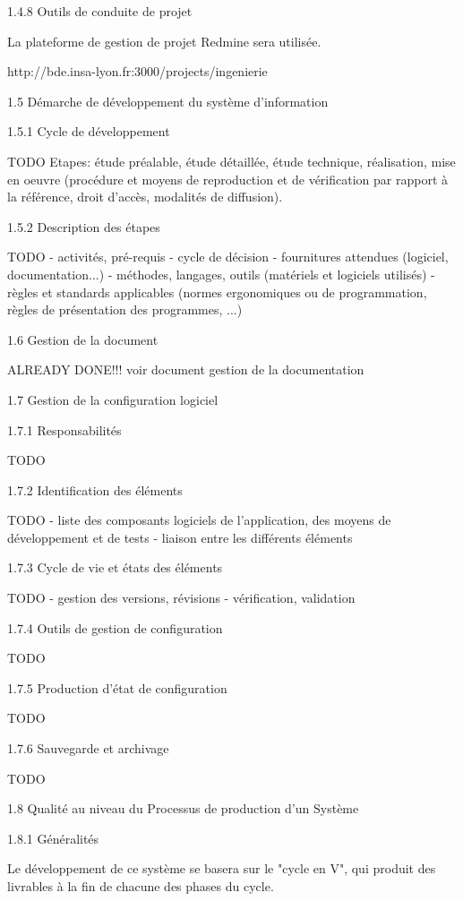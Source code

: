 1.4.8   Outils de conduite de projet

La plateforme de gestion de projet Redmine sera utilisée.

http://bde.insa-lyon.fr:3000/projects/ingenierie

1.5   Démarche de développement du système d'information

1.5.1   Cycle de développement

TODO Etapes: étude préalable, étude détaillée, étude technique, réalisation, mise en oeuvre (procédure et moyens de reproduction et de vérification par rapport à la référence, droit d'accès, modalités de diffusion).

1.5.2   Description des étapes

TODO - activités, pré-requis - cycle de décision - fournitures attendues (logiciel, documentation...) - méthodes, langages, outils (matériels et logiciels utilisés) - règles et standards applicables (normes ergonomiques ou de programmation, règles de présentation des programmes, ...)

1.6   Gestion de la document

ALREADY DONE!!! voir document gestion de la documentation

1.7   Gestion de la configuration logiciel

1.7.1   Responsabilités

TODO

1.7.2   Identification des éléments

TODO - liste des composants logiciels de l'application, des moyens de développement et de tests - liaison entre les différents éléments

1.7.3   Cycle de vie et états des éléments

TODO - gestion des versions, révisions - vérification, validation

1.7.4   Outils de gestion de configuration

TODO

1.7.5   Production d'état de configuration

TODO

1.7.6   Sauvegarde et archivage

TODO

1.8   Qualité au niveau du Processus de production d'un Système

1.8.1   Généralités

Le développement de ce système se basera sur le "cycle en V", qui produit des livrables à la fin de chacune des phases du cycle.

